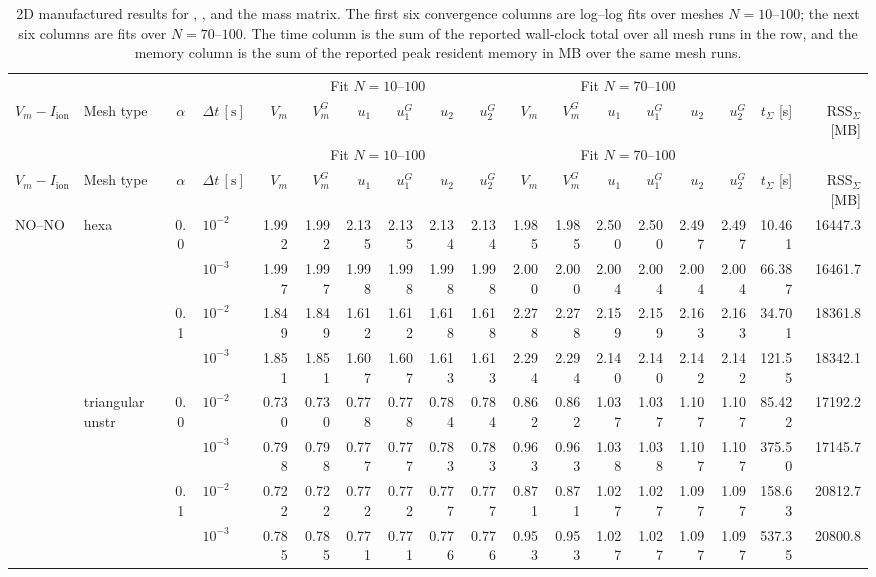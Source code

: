 \tiny
\setlength{\tabcolsep}{1.7pt}
\begin{longtable}{llclrrrrrrrrrrrrrr}
\caption{2D manufactured results for , , and the  mass matrix. The first six convergence columns are log--log fits over meshes $N=10$--$100$; the next six columns are fits over $N=70$--$100$. The time column is the sum of the reported wall-clock total over all mesh runs in the row, and the memory column is the sum of the reported peak resident memory in MB over the same mesh runs.}\label{tab:results-2d-diagonaliion-cn-cons}\\
\toprule
& & & & \multicolumn{6}{c}{Fit $N=10$--$100$} & \multicolumn{6}{c}{Fit $N=70$--$100$} & & \\
\cmidrule(lr){5-10}\cmidrule(lr){11-16}
$V_m-I_{\mathrm{ion}}$ & Mesh type & $\alpha$ & $\Delta t\,[\text{s}]$ & $V_m$ & $V_m^G$ & $u_1$ & $u_1^G$ & $u_2$ & $u_2^G$ & $V_m$ & $V_m^G$ & $u_1$ & $u_1^G$ & $u_2$ & $u_2^G$ & $t_{\Sigma}$ [s] & RSS$_{\Sigma}$ [MB] \\
\midrule
\endfirsthead
\toprule
& & & & \multicolumn{6}{c}{Fit $N=10$--$100$} & \multicolumn{6}{c}{Fit $N=70$--$100$} & & \\
\cmidrule(lr){5-10}\cmidrule(lr){11-16}
$V_m-I_{\mathrm{ion}}$ & Mesh type & $\alpha$ & $\Delta t\,[\text{s}]$ & $V_m$ & $V_m^G$ & $u_1$ & $u_1^G$ & $u_2$ & $u_2^G$ & $V_m$ & $V_m^G$ & $u_1$ & $u_1^G$ & $u_2$ & $u_2^G$ & $t_{\Sigma}$ [s] & RSS$_{\Sigma}$ [MB] \\
\midrule
\endhead
\multirow{8}{*}{NO--NO} & \multirow{4}{*}{hexa} & \multirow{2}{*}{0.0} & $10^{-2}$ & 1.992 & 1.992 & 2.135 & 2.135 & 2.134 & 2.134 & 1.985 & 1.985 & 2.500 & 2.500 & 2.497 & 2.497 & 10.461 & 16447.3 \\
& & & $10^{-3}$ & 1.997 & 1.997 & 1.998 & 1.998 & 1.998 & 1.998 & 2.000 & 2.000 & 2.004 & 2.004 & 2.004 & 2.004 & 66.387 & 16461.7 \\\cline{3-18}
& & \multirow{2}{*}{0.1} & $10^{-2}$ & 1.849 & 1.849 & 1.612 & 1.612 & 1.618 & 1.618 & 2.278 & 2.278 & 2.159 & 2.159 & 2.163 & 2.163 & 34.701 & 18361.8 \\
& & & $10^{-3}$ & 1.851 & 1.851 & 1.607 & 1.607 & 1.613 & 1.613 & 2.294 & 2.294 & 2.140 & 2.140 & 2.142 & 2.142 & 121.55 & 18342.1 \\\cline{2-18}
& \multirow{4}{*}{triangular unstr} & \multirow{2}{*}{0.0} & $10^{-2}$ & 0.730 & 0.730 & 0.778 & 0.778 & 0.784 & 0.784 & 0.862 & 0.862 & 1.037 & 1.037 & 1.107 & 1.107 & 85.422 & 17192.2 \\
& & & $10^{-3}$ & 0.798 & 0.798 & 0.777 & 0.777 & 0.783 & 0.783 & 0.963 & 0.963 & 1.038 & 1.038 & 1.107 & 1.107 & 375.50 & 17145.7 \\\cline{3-18}
& & \multirow{2}{*}{0.1} & $10^{-2}$ & 0.722 & 0.722 & 0.772 & 0.772 & 0.777 & 0.777 & 0.871 & 0.871 & 1.027 & 1.027 & 1.097 & 1.097 & 158.63 & 20812.7 \\
& & & $10^{-3}$ & 0.785 & 0.785 & 0.771 & 0.771 & 0.776 & 0.776 & 0.953 & 0.953 & 1.027 & 1.027 & 1.097 & 1.097 & 537.35 & 20800.8 \\\hline


\end{longtable}
